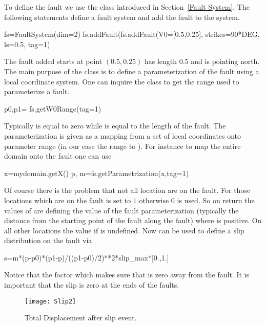 To define the fault we use the  class introduced in Section~\ref{Fault System}. 
The following statements define a fault system  and add the fault  
to the system.
\begin{python}
fs=FaultSystem(dim=2)
fs.addFault(fs.addFault(V0=[0.5,0.25], strikes=90*DEG, ls=0.5, tag=1)
\end{python}
The fault added starts at point $(0.5,0.25)$ has length $0.5$ and is pointing north.
The main purpose of the  class is to define a parameterization
of the fault using a local coordinate system. One can inquire the class
to get the range used to parameterize a fault.
\begin{python}
p0,p1= fs.getW0Range(tag=1)
\end{python}
Typically  is equal to zero while  is equal to the length of the fault. The parameterization
is given as a mapping from a set of local coordinates onto parameter range (in our case 
the range  to ). For instance to map the entire domain  onto the fault 
one can use
\begin{python}
x=mydomain.getX()
p, m=fs.getParametrization(x,tag=1)
\end{python}
Of course there is the problem that not all location are on the fault. For those locations which are on the 
fault  is set to $1$ otherwise $0$ is used. So on return the values of  are defining
the value of the fault parameterization (typically the distance from the starting point of the fault along the fault) 
where  is positive. On all other locations the value if  is undefined. Now  can
be used to define a slip distribution on the fault via
\begin{python}
s=m*(p-p0)*(p1-p)/((p1-p0)/2)**2*slip_max*[0.,1.]
\end{python}
Notice that the factor  which makes sure that  is zero away from the fault. It is important
that the slip is zero at the ends of the faults.

\begin{figure} [ht]
\centerline{\texttt{[image: Slip2]}}
\caption{Total Displacement after slip event.}
\label{fig:slip.2}
\end{figure}

